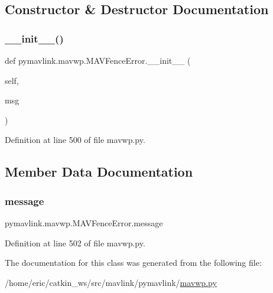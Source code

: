 \subsection{Constructor \& Destructor Documentation}
\mbox{\label{classpymavlink_1_1mavwp_1_1MAVFenceError_aabdf0e25a42b3bd0429299ba0f041280}} 
\subsubsection{\texorpdfstring{\_\_init\_\_()}{\_\_init\_\_()}}
{\footnotesize\ttfamily def pymavlink.\+mavwp.\+M\+A\+V\+Fence\+Error.\+\_\+\+\_\+init\+\_\+\+\_\+ (\begin{DoxyParamCaption}\item[{}]{self,  }\item[{}]{msg }\end{DoxyParamCaption})}



Definition at line 500 of file mavwp.\+py.



\subsection{Member Data Documentation}
\mbox{\label{classpymavlink_1_1mavwp_1_1MAVFenceError_aa94a26ad55aed2b325444967ea283e95}} 
\subsubsection{\texorpdfstring{message}{message}}
{\footnotesize\ttfamily pymavlink.\+mavwp.\+M\+A\+V\+Fence\+Error.\+message}



Definition at line 502 of file mavwp.\+py.



The documentation for this class was generated from the following file\+:\begin{DoxyCompactItemize}
\item 
/home/eric/catkin\+\_\+ws/src/mavlink/pymavlink/\mbox{\hyperlink{mavwp_8py}{mavwp.\+py}}\end{DoxyCompactItemize}
